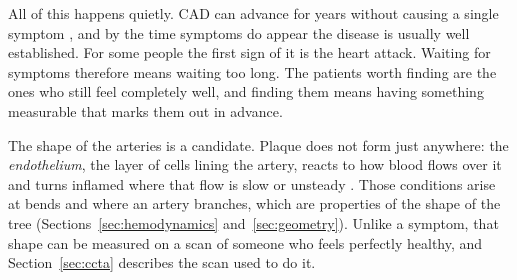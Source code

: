 All of this happens quietly.
CAD can advance for years without causing a single symptom \cite{knuuti2019esc}, and by the time symptoms do appear the disease is usually well established.
For some people the first sign of it is the heart attack.
Waiting for symptoms therefore means waiting too long.
The patients worth finding are the ones who still feel completely well, and finding them means
having something measurable that marks them out in advance.

The shape of the arteries is a candidate.
Plaque does not form just anywhere: the \emph{endothelium}, the layer of cells lining the artery,
reacts to how blood flows over it and turns inflamed where that flow is slow or unsteady
\cite{rampidis2022geometry}.
Those conditions arise at bends and where an artery branches, which are properties of the shape of
the tree (Sections~\ref{sec:hemodynamics} and~\ref{sec:geometry}).
Unlike a symptom, that shape can be measured on a scan of someone who feels perfectly healthy, and
Section~\ref{sec:ccta} describes the scan used to do it.

